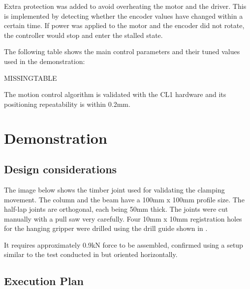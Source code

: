Extra protection was added to avoid overheating the motor and the driver. This is implemented by detecting whether the encoder values have changed within a certain time. If power was applied to the motor and the encoder did not rotate, the controller would stop and enter the stalled state. 

The following table shows the main control parameters and their tuned values used in the demonstration:

MISSINGTABLE

The motion control algorithm is validated with the CL1 hardware and its positioning repeatability is within 0.2mm.

\section{Demonstration}
\label{section:exploration-1-demonstration}

\subsection{Design considerations}
\label{subsection:exploration-1-design-considerations}

The image below shows the timber joint used for validating the clamping movement. The column and the beam have a 100mm x 100mm profile size. The half-lap joints are orthogonal, each being 50mm thick. The joints were cut manually with a pull saw very carefully. Four 10mm x 10mm registration holes for the hanging gripper were drilled using the drill guide shown in .

It requires approximately 0.9kN force to be assembled, confirmed using a setup similar to the test conducted in  but oriented horizontally.
\subsection{Execution Plan}
\label{subsection:exploration-1-execution-plan}

